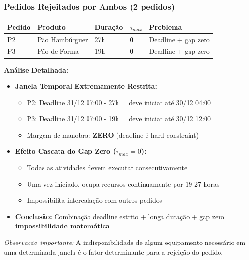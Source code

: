 \documentclass[11pt,a4paper]{article}
\begin{document}
\subsubsection{Pedidos Rejeitados por Ambos (2 pedidos)}

\begin{center}
\begin{tabular}{lllll}
\toprule
\textbf{Pedido} & \textbf{Produto} & \textbf{Duração} & \textbf{$\tau_{max}$} & \textbf{Problema} \\
\midrule
P2 & Pão Hambúrguer & 27h & \textbf{0} & Deadline + gap zero \\
P3 & Pão de Forma & 19h & \textbf{0} & Deadline + gap zero \\
\bottomrule
\end{tabular}
\end{center}

\textbf{Análise Detalhada:}
\begin{itemize}
    \item \textbf{Janela Temporal Extremamente Restrita:}
    \begin{itemize}
        \item P2: Deadline 31/12 07:00 - 27h = deve iniciar até 30/12 04:00
        \item P3: Deadline 31/12 07:00 - 19h = deve iniciar até 30/12 12:00
        \item Margem de manobra: \textbf{ZERO} (deadline é hard constraint)
    \end{itemize}

    \item \textbf{Efeito Cascata do Gap Zero ($\tau_{max} = 0$):}
    \begin{itemize}
        \item Todas as atividades devem executar consecutivamente
        \item Uma vez iniciado, ocupa recursos continuamente por 19-27 horas
        \item Impossibilita intercalação com outros pedidos
    \end{itemize}

    \item \textbf{Conclusão:} Combinação deadline estrito + longa duração + gap zero = \textbf{impossibilidade matemática}
    
\end{itemize}
\textit{Observação importante:} A indisponibilidade de algum equipamento necessário em uma determinada janela é o fator determinante para a rejeição do pedido.
\end{document}
